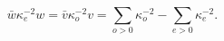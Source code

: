 \begin{equation}
\bar{w}\kappa _{e}^{-2}w=\bar{v}\kappa _{o}^{-2}v=\sum_{o>0}\kappa
_{o}^{-2}-\sum_{e>0}\kappa _{e}^{-2}.  \label{w2w}
\end{equation}

